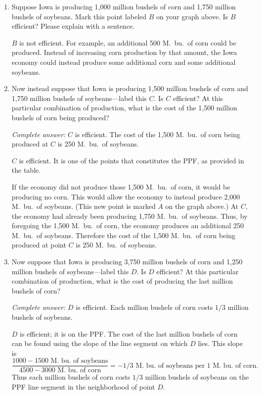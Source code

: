 \documentclass{assignment}
\begin{document}
\begin{enumerate}
\item Suppose Iowa is producing 1,000 million bushels of corn and 1,750 million bushels of soybeans. Mark this point labeled $B$ on your graph above. Is $B$ efficient? Please explain with a sentence.


\begin{solution}
$B$ is not efficient. For example, an additional 500 M.~bu.~of corn could be produced. Instead of increasing corn production by that amount, the Iowa economy could instead produce some additional corn and some additional soybeans.
\end{solution}

\item Now instead suppose that Iowa is producing 1,500 million bushels of corn and 1,750 million bushels of soybeans---label this $C$. Is $C$ efficient? At this particular combination of production, what is the cost of the 1,500 million bushels of corn being produced?

\begin{solution}
\emph{Complete answer:} $C$ is efficient. The cost of the 1,500 M.~bu.~of corn being produced at $C$ is 250 M.~bu.~of soybeans.

$C$ is efficient. It is one of the points that constitutes the PPF, as provided in the table.

If the economy did not produce those 1,500 M.~bu.~of corn, it would be producing no corn. This would allow the economy to instead produce 2,000 M.~bu.~of soybeans. (This new point is marked $A$ on the graph above.) At $C,$ the economy had already been producing 1,750 M.~bu.~of soybeans. Thus, by foregoing the 1,500 M.~bu.~of corn, the economy produces an additional 250 M.~bu.~of soybeans. Therefore the cost of the 1,500 M.~bu.~of corn being produced at point $C$ is 250 M.~bu.~of soybeans.
\end{solution}
\item Now suppose that Iowa is producing 3,750 million bushels of corn and 1,250 million bushels of soybeans---label this $D.$ Is $D$ efficient? At this particular combination of production, what is the cost of producing the last million bushels of corn?

\begin{solution}
\emph{Complete answer:} $D$ is efficient. Each million bushels of corn costs $1/3$ million bushels of soybeans.

$D$ is efficient; it is on the PPF. The cost of the last million bushels of corn can be found using the slope of the line segment on which $D$ lies. This slope is $$\frac{1000-1500\text{ M.~bu.~of soybeans}}{4500-3000\text{ M.~bu.~of corn}}=-1/3\text{ M.~bu.~of soybeans per 1 M.~bu.~of corn.}$$
Thus each million bushels of corn costs $1/3$ million bushels of soybeans on the PPF line segment in the neighborhood of point $D.$


\end{solution}
\end{enumerate}
\end{document}
